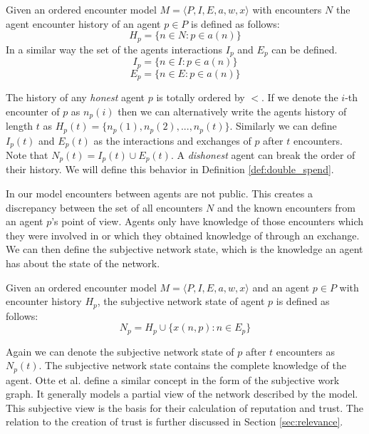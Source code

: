 \begin{defn}
    Given an ordered encounter model $M = \langle P, I, E, a, w, x \rangle$ with encounters $N$ the 
    agent encounter history of an agent $p \in P$ is defined as follows:
    \begin{equation}
        H_p = \{ n \in N : p \in a(n) \}
    \end{equation}
    In a similar way the set of the agents interactions $I_p$ and $E_p$ can be defined.
    \begin{equation}
        I_p = \{ n \in I : p \in a(n) \}
    \end{equation}
    \begin{equation}
        E_p = \{ n \in E : p \in a(n) \}
    \end{equation}
\end{defn}

The history of any \textit{honest} agent $p$ is totally ordered by $<$. If we denote the 
$i$-th encounter of $p$ as $n_p(i)$ then we can alternatively write the agents history of length $t$ 
 as $H_p(t) = \{ n_p(1), n_p(2), ..., n_p(t)\}$. Similarly we can define $I_p(t)$ and 
$E_p(t)$ as the interactions and exchanges of $p$ after $t$ encounters. Note that $N_p(t) = I_p(t) \cup E_p(t)$. 
A \textit{dishonest} agent can break the order of their history. We will define this behavior in 
Definition \ref{def:double_spend}.

In our model encounters between agents are not public. This creates a discrepancy between the set of all
encounters $N$ and the known encounters from an agent $p$'s point of view. Agents only have 
knowledge of those encounters which they were involved in or which they obtained knowledge of through an exchange.
We can then define the subjective network state, which is the knowledge an agent has about the state of
the network.

\begin{defn}
    \label{def:subjective_network_state}
    Given an ordered encounter model $M = \langle P, I, E, a, w, x \rangle$  and an agent $p \in P$ 
    with encounter history $H_p$, the subjective network state of agent $p$
    is defined as follows:
    \begin{equation}
        N_p = H_p \cup \{ x(n, p) : n \in E_p \}
    \end{equation}
\end{defn}

Again we can denote the subjective network state of $p$ after $t$ encounters as $N_p(t)$.
The subjective network state contains the complete knowledge of the agent. Otte et al. define a
similar concept in the form of the subjective work graph. It generally models a partial view
of the network described by the model. This subjective view is the basis for their calculation of 
reputation and trust. The relation to the creation of trust is further discussed in Section \ref{sec:relevance}.

